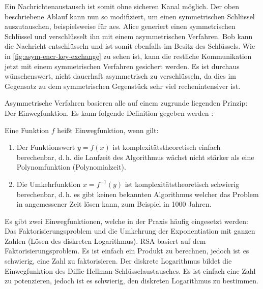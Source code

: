 

\noindent
Ein Nachrichtenaustausch ist somit ohne sicheren Kanal möglich. Der oben beschriebene
Ablauf kann nun so modifiziert, um einen symmetrischen Schlüssel auszutauschen, beispielsweise
für \acs{aes}. Alice generiert einen symmetrischen Schlüssel und verschlüsselt ihn mit einem
asymmetrischen Verfahren. Bob kann die Nachricht entschlüsseln und ist somit ebenfalls
im Besitz des Schlüssels. Wie in \autoref{fig:asym-encr-key-exchange} zu sehen ist,
kann die restliche Kommunikation jetzt mit einem symmetrischen
Verfahren gesichert werden. Es ist durchaus wünschenswert, nicht dauerhaft asymmetrisch
zu verschlüsseln, da dies im Gegensatz zu dem symmetrischen Gegenstück sehr viel
rechenintensiver ist.
\newpage



\noindent
Asymmetrische Verfahren basieren alle auf einem zugrunde liegenden Prinzip:
Der Einwegfunktion. Es kann folgende
Definition gegeben werden \parencite[153]{BOOK:crypto}:

\begin{definition}[Einwegfunktion]
  Eine Funktion $f$ heißt Einwegfunktion, wenn gilt:
  \begin{enumerate}
    \item Der Funktionswert $y = f(x)$ ist komplexitätstheoretisch einfach berechenbar,
          d.\,h. die Laufzeit des Algorithmus wächst
          nicht stärker als eine Polynomfunktion (Polynomialzeit).
    \item Die Umkehrfunktion $x = f^{-1}(y)$ ist komplexitätstheoretisch schwierig berechenbar,
          d.\,h. es gibt keinen bekannten Algorithmus welcher das Problem in angemessener
          Zeit lösen kann, zum Beispiel in 1000 Jahren.
  \end{enumerate}
\end{definition}

\noindent
Es gibt zwei Einwegfunktionen, welche in der Praxis häufig eingesetzt werden:
Das Faktorisierungsproblem und die Umkehrung der Exponentiation mit ganzen Zahlen
(Lösen des diskreten Logarithmus).
RSA basiert auf dem Faktorisierungsproblem.
Es ist einfach ein Produkt zu berechnen, jedoch ist es schwierig, eine Zahl zu
faktorisieren.
Der diskrete Logarithmus bildet die Einwegfunktion des
Diffie-Hellman-Schlüsselaustausches.
Es ist einfach eine Zahl zu potenzieren, jedoch ist es schwierig,
den diskreten Logarithmus zu bestimmen.
\newpage

